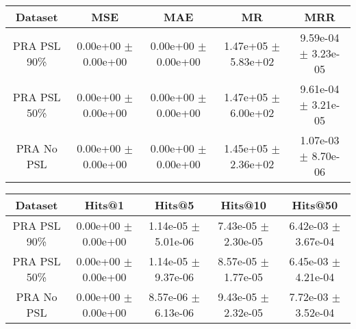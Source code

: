 \begin{tabular}{c|cccc}
Dataset & MSE & MAE & MR & MRR\\
\hline
PRA PSL 90\% & 0.00e+00 $\pm$ 0.00e+00 & 0.00e+00 $\pm$ 0.00e+00 & 1.47e+05 $\pm$ 5.83e+02 & 9.59e-04 $\pm$ 3.23e-05 \\
PRA PSL 50\% & 0.00e+00 $\pm$ 0.00e+00 & 0.00e+00 $\pm$ 0.00e+00 & 1.47e+05 $\pm$ 6.00e+02 & 9.61e-04 $\pm$ 3.21e-05 \\
PRA No PSL & 0.00e+00 $\pm$ 0.00e+00 & 0.00e+00 $\pm$ 0.00e+00 & 1.45e+05 $\pm$ 2.36e+02 & 1.07e-03 $\pm$ 8.70e-06 \\
\end{tabular}\begin{tabular}{c|cccc}
Dataset & Hits@1 & Hits@5 & Hits@10 & Hits@50\\
\hline
PRA PSL 90\% & 0.00e+00 $\pm$ 0.00e+00 & 1.14e-05 $\pm$ 5.01e-06 & 7.43e-05 $\pm$ 2.30e-05 & 6.42e-03 $\pm$ 3.67e-04 \\
PRA PSL 50\% & 0.00e+00 $\pm$ 0.00e+00 & 1.14e-05 $\pm$ 9.37e-06 & 8.57e-05 $\pm$ 1.77e-05 & 6.45e-03 $\pm$ 4.21e-04 \\
PRA No PSL & 0.00e+00 $\pm$ 0.00e+00 & 8.57e-06 $\pm$ 6.13e-06 & 9.43e-05 $\pm$ 2.32e-05 & 7.72e-03 $\pm$ 3.52e-04 \\
\end{tabular}